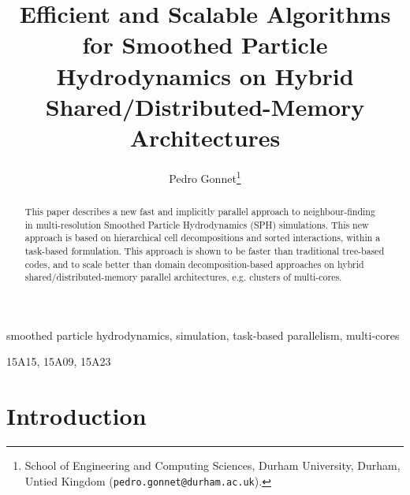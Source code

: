 \documentclass[final]{siamltex}
\date{}
\title{Efficient and Scalable Algorithms for Smoothed Particle Hydrodynamics on
    Hybrid Shared/Distributed-Memory Architectures}
\author{Pedro Gonnet\thanks{School of Engineering and Computing Sciences,
    Durham University, Durham, Untied Kingdom ({\tt pedro.gonnet@durham.ac.uk}).}}
\begin{document}
\lstset{%
    language=C,
    basicstyle=\small\tt,
    numbers=left,
    numberstyle=\tiny
    }


\maketitle


\begin{abstract}
This paper describes a new fast and implicitly parallel
approach to neighbour-finding in multi-resolution
Smoothed Particle Hydrodynamics (SPH) simulations.
This new approach is based on hierarchical cell decompositions and
sorted interactions, within a task-based formulation.
This approach is shown to be faster than traditional tree-based
codes, and to scale better than domain decomposition-based approaches on
hybrid shared/distributed-memory parallel architectures, e.g. clusters
of multi-cores.
\end{abstract}


\begin{keywords} 
smoothed particle hydrodynamics,
simulation,
task-based parallelism,
multi-cores
\end{keywords}

\begin{AMS}
15A15, 15A09, 15A23
\end{AMS}

\pagestyle{myheadings}
\thispagestyle{plain}


\section{Introduction}
\end{document}
